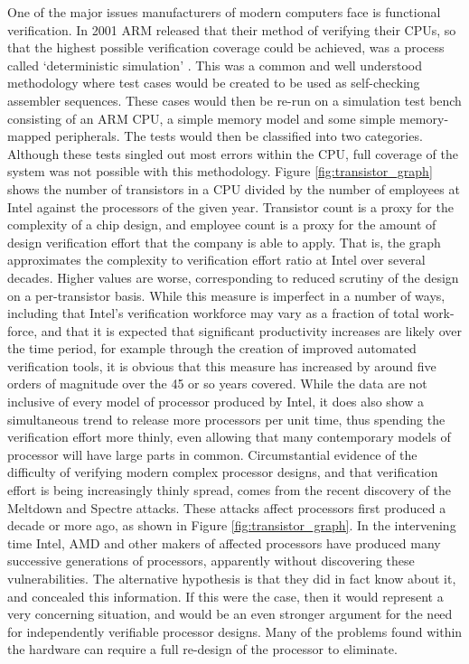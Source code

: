 	One of the major issues manufacturers of modern computers face is functional verification. In 2001 ARM released that their method of verifying their CPUs, so that the highest possible verification coverage could be achieved, was a process called ‘deterministic simulation’ \cite{RN6}. This was a common and well understood methodology where test cases would be created to be used as self-checking assembler sequences. These cases would then be re-run on a simulation test bench consisting of an ARM CPU, a simple memory model and some simple memory-mapped peripherals. The tests would then be classified into two categories. Although these tests singled out most errors within the CPU, full coverage of the system was not possible with this methodology.
Figure \ref{fig:transistor_graph} shows the number of transistors in a CPU divided by the number of employees at Intel against the processors of the given year. Transistor count is a proxy for the complexity of a chip design, and employee count is a proxy for the amount of design verification effort that the company is able to apply. That is, the graph approximates the complexity to verification effort ratio at Intel over several decades. Higher values are worse, corresponding to reduced scrutiny of the design on a per-transistor basis. While this measure is imperfect in a number of ways, including that Intel’s verification workforce may vary as a fraction of total work-force, and that it is expected that significant productivity increases are likely over the time period, for example through the creation of improved automated verification tools, it is obvious that this measure has increased by around five orders of magnitude over the 45 or so years covered. While the data are not inclusive of every model of processor produced by Intel, it does also show a simultaneous trend to release more processors per unit time, thus spending the verification effort more thinly, even allowing that many contemporary models of processor will have large parts in common. 
	Circumstantial evidence of the difficulty of verifying modern complex processor designs, and that verification effort is being increasingly thinly spread, comes from the recent discovery of the Meltdown and Spectre attacks. These attacks affect processors first produced a decade or more ago, as shown in Figure \ref{fig:transistor_graph}. In the intervening time Intel, AMD and other makers of affected processors have produced many successive generations of processors, apparently without discovering these vulnerabilities. The alternative hypothesis is that they did in fact know about it, and concealed this information. If this were the case, then it would represent a very concerning situation, and would be an even stronger argument for the need for independently verifiable processor designs. Many of the problems found within the hardware can require a full re-design of the processor to eliminate.

